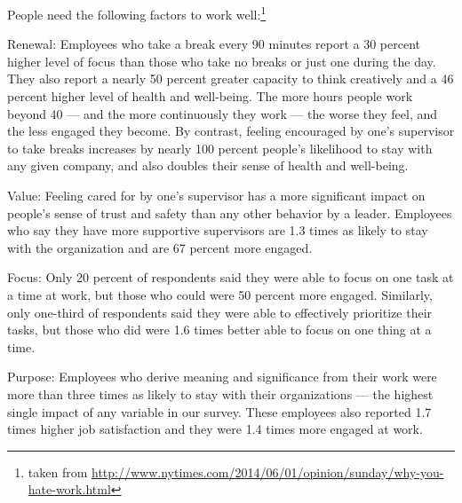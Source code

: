\documentclass[12pt]{article}
\begin{document}
People need the following factors to work well:\footnote{taken from \url{http://www.nytimes.com/2014/06/01/opinion/sunday/why-you-hate-work.html}}
\begin{compactitem}
\item Renewal: Employees who take a break every 90 minutes report a 30 percent higher level of focus than those who take no breaks or just one during the day. They also report a nearly 50 percent greater capacity to think creatively and a 46 percent higher level of health and well-being. The more hours people work beyond 40 — and the more continuously they work — the worse they feel, and the less engaged they become. By contrast, feeling encouraged by one’s supervisor to take breaks increases by nearly 100 percent people’s likelihood to stay with any given company, and also doubles their sense of health and well-being.
\item Value: Feeling cared for by one's supervisor has a more significant impact on people's sense of trust and safety than any other behavior by a leader. Employees who say they have more supportive supervisors are 1.3 times as likely to stay with the organization and are 67 percent more engaged.
\item Focus: Only 20 percent of respondents said they were able to focus on one task at a time at work, but those who could were 50 percent more engaged. Similarly, only one-third of respondents said they were able to effectively prioritize their tasks, but those who did were 1.6 times better able to focus on one thing at a time.
\item Purpose: Employees who derive meaning and significance from their work were more than three times as likely to stay with their organizations — the highest single impact of any variable in our survey. These employees also reported 1.7 times higher job satisfaction and they were 1.4 times more engaged at work.
\end{compactitem}
\medskip
\end{document}

